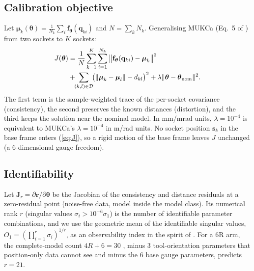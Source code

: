 \documentclass[conference]{IEEEtran}
\begin{document}
\subsection{Calibration objective}
Let $\boldsymbol\mu_k(\boldsymbol\theta)=\frac{1}{N_k}\sum_i\mathbf f_{\boldsymbol\theta}(\mathbf q_{ki})$ and
$N=\sum_k N_k$. Generalising MUKCa (Eq.~5 of \cite{franzese2026mukca}) from two sockets to $K$ sockets:
\begin{align}
J(\boldsymbol\theta)&=\frac1N\sum_{k=1}^{K}\sum_{i=1}^{N_k}\big\|\mathbf f_{\boldsymbol\theta}(\mathbf q_{ki})-\boldsymbol\mu_k\big\|^2\nonumber\\
&+\!\!\sum_{(k,l)\in\mathcal D}\!\!\big(\|\boldsymbol\mu_k-\boldsymbol\mu_l\|-d_{kl}\big)^2
+\lambda\|\boldsymbol\theta-\boldsymbol\theta_{\rm nom}\|^2 .\label{eq:J}
\end{align}
The first term is the sample-weighted trace of the per-socket covariance (consistency), the second preserves the known
distances (distortion), and the third keeps the solution near the nominal model. In mm/mrad units, $\lambda=10^{-4}$ is
equivalent to MUKCa's $\lambda=10^{-4}$ in m/rad units. No socket position $\mathbf s_k$ in the base frame enters
(\ref{eq:J}), so a rigid motion of the base frame leaves $J$ unchanged (a 6-dimensional gauge freedom).

\subsection{Identifiability}
Let $\mathbf J_r=\partial\mathbf r/\partial\boldsymbol\theta$ be the Jacobian of the consistency and distance residuals
at a zero-residual point (noise-free data, model inside the model class). Its numerical rank $r$ (singular values
$\sigma_i>10^{-6}\sigma_1$) is the number of identifiable parameter combinations, and we use the geometric mean of the
identifiable singular values, $O_1=(\prod_{i=1}^{r}\sigma_i)^{1/r}$, as an observability index in the spirit of
\cite{borm1991}. For a 6R arm, the complete-model count $4R+6=30$ \cite{everett1987,zhuang1992}, minus 3 tool-orientation
parameters that position-only data cannot see and minus the 6 base gauge parameters, predicts $r=21$.
\end{document}

